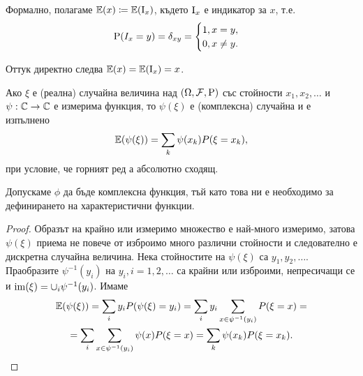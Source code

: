 \documentclass[numbers=endperiod, DIV=15, bibliography=totocnumbered]{scrartcl}
\begin{document}
\begin{note}
  Формално, полагаме $\mathbb{E}(x) \coloneqq \mathbb{E}(\operatorname{I}_x)$, където $\operatorname{I}_x$ е индикатор за $x$, т.е.
  \begin{displaymath}
    \operatorname{P}(I_x = y) = \delta_{xy} = \begin{cases}
      1, x = y, \\
      0, x \neq y.
    \end{cases}
  \end{displaymath}

  Оттук директно следва $\mathbb{E}(x) = \mathbb{E}(\operatorname{I}_x) = x$.
\end{note}

\begin{proposition}\label{thm:lotus}
  Ако $\xi$ е (реална) случайна величина над $(\Omega, \mathcal{F}, \operatorname{P})$ със стойности $x_1, x_2, \ldots$ и $\psi: \mathbb{C} \to \mathbb{C}$ е измерима функция, то $\psi(\xi)$ е (комплексна) случайна и е изпълнено
  \begin{displaymath}
    \mathbb{E}(\psi(\xi))
    =
    \sum_k \psi(x_k) P(\xi = x_k),
  \end{displaymath}
  при условие, че горният ред а абсолютно сходящ.
\end{proposition}

\begin{note}
  Допускаме $\phi$ да бъде комплексна функция, тъй като това ни е необходимо за дефинирането на характеристични функции.
\end{note}

\begin{proof}
  Образът на крайно или измеримо множество е най-много измеримо, затова $\psi(\xi)$ приема не повече от изброимо много различни стойности и следователно е дискретна случайна величина. Нека стойностите на $\psi(\xi)$ са $y_1, y_2, \ldots$. Праобразите $\psi^{-1}(y_i)$ на $y_i, i = 1, 2, \ldots$ са крайни или изброими, непресичащи се и $\operatorname{im}(\xi) = \cup_i \psi^{-1}(y_i)$. Имаме
  \begin{multline*}
    \mathbb{E}(\psi(\xi))
    =
    \sum_i y_i P(\psi(\xi) = y_i)
    =
    \sum_i y_i \sum_{x \in \psi^{-1}(y_i)} P(\xi = x)
    = \\ =
    \sum_i \sum_{x \in \psi^{-1}(y_i)} \psi(x) P(\xi = x)
    =
    \sum_k \psi(x_k) P(\xi = x_k).
  \end{multline*}
\end{proof}
\end{document}
